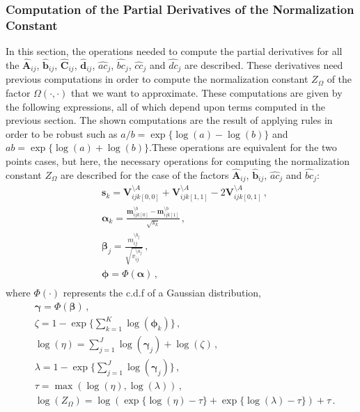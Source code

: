 \subsubsection{Computation of the Partial Derivatives of the Normalization Constant}

In this section, the operations needed to compute the partial derivatives for all the $\hat{\boldsymbol{A}}_{ij}$, $\hat{\boldsymbol{b}}_{ij}$, $\hat{\boldsymbol{C}}_{ij}$, $\hat{\boldsymbol{d}}_{ij}$, $\hat{ac}_j$, $\hat{bc}_j$, $\hat{cc}_j$ and $\hat{dc}_j$ are described. These derivatives need previous computations in order to compute the normalization constant $Z_\Omega$ of the factor $\Omega(\cdot,\cdot)$ that we want to approximate. These computations are given by the following expressions, all of which depend upon terms computed in the previous section. The shown computations are the result of applying rules in order to be robust such as $a/b = \exp\{\log(a)-\log(b)\}$ and $ab = \exp\{\log(a)+\log(b)\}$.These operations are equivalent for the two points cases, but here, the necessary operations for computing the normalization constant $Z_\Omega$ are described for the case of the factors $\hat{\boldsymbol{A}}_{ij}$, $\hat{\boldsymbol{b}}_{ij}$, $\hat{ac}_j$ and $\hat{bc}_j$:
\begin{align}
    & \boldsymbol{s}_k = \boldsymbol{V}_{ijk[0,0]}^{\setminus A} + \boldsymbol{V}_{ijk[1,1]}^{\setminus A} - 2\boldsymbol{V}_{ijk[0,1]}^{\setminus A}\,, \\
    & \boldsymbol{\alpha}_k = \frac{\boldsymbol{m}_{ijk[0]}^{\setminus b}-\boldsymbol{m}_{ijk[1]}^{\setminus b}}{\sqrt{s_k}}\,, \\
    & \boldsymbol{\beta}_j = \frac{m_{ij}^{\setminus b_j}}{\sqrt{v_{ij}^{\setminus a_j}}}\,, \\
    & \boldsymbol{\phi} = \Phi(\boldsymbol{\alpha})\,, \\
\end{align}
where $\Phi(\cdot)$ represents the c.d.f of a Gaussian distribution,
\begin{align}
    & \boldsymbol{\gamma} = \Phi(\boldsymbol{\beta})\,, \\
    & \zeta = 1-\exp\{\sum_{k=1}^{K} \log(\boldsymbol{\phi}_k)\}\,, \\
    & \log(\eta) = \sum_{j=1}^{J}\log(\boldsymbol{\gamma}_j) + \log(\zeta)\,, \\
    & \lambda = 1-\exp\{\sum_{j=1}^{J}\log(\boldsymbol{\gamma}_j)\}\,, \\
    & \tau = \max(\log(\eta),\log(\lambda))\,, \\
    & \log(Z_\Omega) = \log(\exp\{\log(\eta) - \tau\} + \exp\{\log(\lambda) - \tau\}) + \tau\,.
\end{align}
